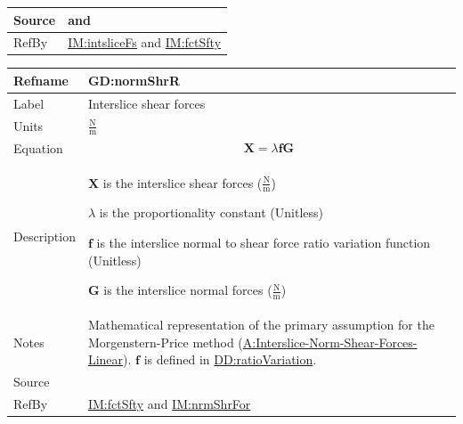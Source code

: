 \documentclass[12pt]{article}
\begin{document}
\begin{minipage}{\textwidth}
\begin{tabular}{>{\raggedright}p{}>{\raggedright\arraybackslash}p{}}
\\ \midrule
Source & \cite{chen2005} and \cite{karchewski2012}
         
\\ \midrule
RefBy & \hyperref[IM:intsliceFs]{IM:intsliceFs} and \hyperref[IM:fctSfty]{IM:fctSfty}
        
\\ \bottomrule
\end{tabular}
\end{minipage}

\medskip
\noindent
\begin{minipage}{\textwidth}
\begin{tabular}{>{\raggedright}p{}>{\raggedright\arraybackslash}p{}}
\toprule \textbf{Refname} & \textbf{GD:normShrR}
\label{GD:normShrR}
\\ \midrule
Label & Interslice shear forces
        
\\ \midrule
Units & $\frac{\text{N}}{\text{m}}$
        
\\ \midrule
Equation & \begin{displaymath}
           \symbf{X}=λ \symbf{f} \symbf{G}
           \end{displaymath}
\\ \midrule
Description & \begin{symbDescription}
              \item{$\symbf{X}$ is the interslice shear forces ($\frac{\text{N}}{\text{m}}$)}
              \item{$λ$ is the proportionality constant (Unitless)}
              \item{$\symbf{f}$ is the interslice normal to shear force ratio variation function (Unitless)}
              \item{$\symbf{G}$ is the interslice normal forces ($\frac{\text{N}}{\text{m}}$)}
              \end{symbDescription}
\\ \midrule
Notes & Mathematical representation of the primary assumption for the Morgenstern-Price method (\hyperref[assumpINSFL]{A:Interslice-Norm-Shear-Forces-Linear}). $\symbf{f}$ is defined in \hyperref[DD:ratioVariation]{DD:ratioVariation}.
        
\\ \midrule
Source & \cite{chen2005}
         
\\ \midrule
RefBy & \hyperref[IM:fctSfty]{IM:fctSfty} and \hyperref[IM:nrmShrFor]{IM:nrmShrFor}
        
\\ \bottomrule
\end{tabular}
\end{minipage}
\end{document}
